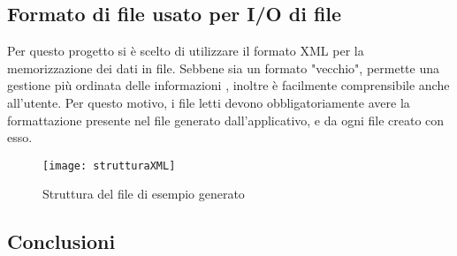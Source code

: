 \documentclass[10pt]{article}
\begin{document}
    \subsection{Formato di file usato per I/O di file}
    Per questo progetto si è scelto di utilizzare il formato XML per la memorizzazione dei dati in file. Sebbene sia un formato "vecchio", permette una gestione più ordinata delle informazioni , inoltre è facilmente comprensibile anche all'utente.
    Per questo motivo, i file letti devono obbligatoriamente avere la formattazione presente nel file generato dall'applicativo, e da ogni file creato con esso. 
    \begin{figure}[h!]
    	\centering
    	\texttt{[image: strutturaXML]}
    	\caption{Struttura del file di esempio generato}
    	\label{fig:strutturaxml}
    \end{figure}
    \subsection{Conclusioni}
    
	
\end{document}
